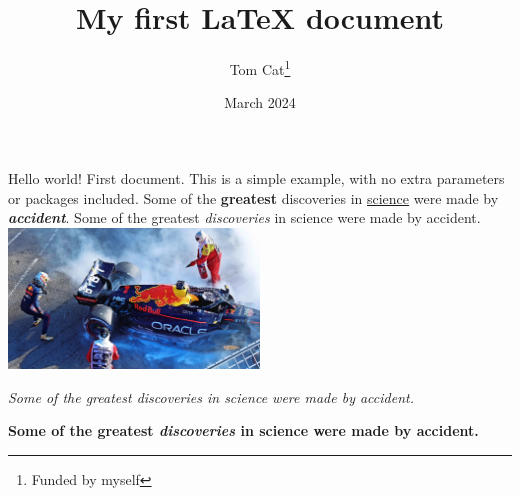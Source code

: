 \documentclass[12pt, letterpaper]{article}
\title{My first LaTeX document}
\author{Tom Cat\thanks{Funded by myself}}
\date{March 2024}
\begin{document}
\maketitle
Hello world!
First document. This is a simple example, with no
extra parameters or packages included.
Some of the \textbf{greatest}
discoveries in \underline{science}
were made by \textbf{\textit{accident}}.
Some of the greatest \emph{discoveries} in science 
were made by accident.
\includegraphics[width=0.5\textwidth]{GEEJj_kXYAImdwn}

\textit{Some of the greatest \emph{discoveries} 
in science were made by accident.}

\textbf{Some of the greatest \emph{discoveries} 
in science were made by accident.}
\end{document}
